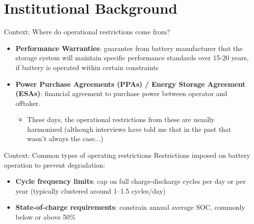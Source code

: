\documentclass{beamer}
\begin{document}
\section{Institutional Background}

\begin{frame}{Context: Where do operational restrictions come from?}
\begin{itemize}
    \item \textbf{Performance Warranties}: guarantee from battery manufacturer that the storage system will maintain specific performance standards over 15-20 years, if battery is operated within certain constraints
    \item \textbf{Power Purchase Agreements (PPAs) / Energy Storage Agreement (ESAs)}: financial agreement to purchase power between operator and offtaker. 
    \begin{itemize}
        \item These days, the operational restrictions from these are usually harmonized (although interviews have told me that in the past that wasn't always the case...)
    \end{itemize}
\end{itemize}
\end{frame}



\begin{frame}{Context: Common types of operating restrictions}
Restrictions imposed on battery operation to prevent degradation:
\begin{itemize}
    \item \textbf{Cycle frequency limits}: cap on full charge-discharge cycles per day or per year (typically clustered around 1--1.5 cycles/day)
    \item \textbf{State-of-charge requirements}: constrain annual average SOC, commonly below or above 50\%
\end{itemize}
\end{frame}
\end{document}

